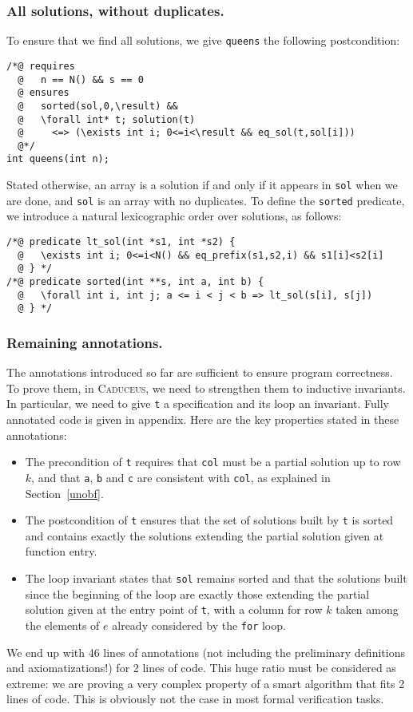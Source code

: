 \documentclass[a4paper]{llncs}
\newcommand{\caduceus}{\textsc{Caduceus}}
\begin{document}
\subsubsection{All solutions, without duplicates.}
To ensure that we find all solutions, we give \texttt{queens} the
following postcondition:
\begin{verbatim}
/*@ requires
  @   n == N() && s == 0
  @ ensures 
  @   sorted(sol,0,\result) &&
  @   \forall int* t; solution(t) 
  @     <=> (\exists int i; 0<=i<\result && eq_sol(t,sol[i]))
  @*/
int queens(int n);
\end{verbatim}
Stated otherwise, an array is a solution if and only if it appears in
\texttt{sol} when we are done, and \texttt{sol} is an
array with no duplicates. To define the
\texttt{sorted} predicate, we introduce a natural lexicographic order
over solutions, as follows:
\begin{verbatim}
/*@ predicate lt_sol(int *s1, int *s2) {
  @   \exists int i; 0<=i<N() && eq_prefix(s1,s2,i) && s1[i]<s2[i]
  @ } */
/*@ predicate sorted(int **s, int a, int b) {
  @   \forall int i, int j; a <= i < j < b => lt_sol(s[i], s[j])
  @ } */
\end{verbatim}

\subsubsection{Remaining annotations.} 
The annotations introduced so far are sufficient to ensure program
correctness. To prove them, in \caduceus, we need to strengthen them
to inductive invariants. In particular, we need
to give \texttt{t} a specification and its loop an invariant.
Fully annotated code is given in appendix. Here are the key properties
stated in these annotations:
\begin{itemize}
\item The precondition of \texttt{t} requires that \texttt{col} must be a
  partial solution up to row $k$, and that \texttt{a},
  \texttt{b} and \texttt{c} are consistent with \texttt{col}, as
  explained in Section~\ref{unobf}.
\item The postcondition of \texttt{t} ensures that the set of
  solutions built by \texttt{t} is sorted and contains exactly the 
  solutions extending the partial solution given at function entry.
\item The loop invariant states that \texttt{sol} remains sorted and
  that the solutions built since the beginning of the loop are
  exactly those extending the partial solution given at the entry
  point of \texttt{t}, with a column for row $k$ taken among the
  elements of $e$ already considered by the \texttt{for} loop.
\end{itemize}
We end up with 46 lines of annotations (not including the preliminary
definitions and axiomatizations!) for 2 lines of code. This huge
ratio must be considered as extreme: we are proving a very complex
property of a smart algorithm that fits 2 lines of code. This
is obviously not the case in most formal verification tasks.
\end{document}
